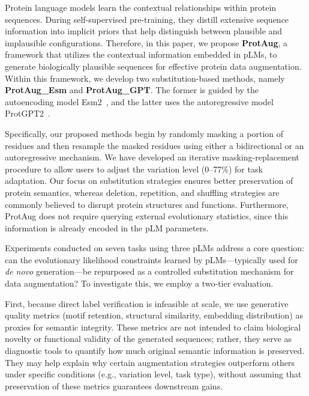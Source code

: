 \documentclass{article}
\begin{document}
Protein language models learn the contextual relationships within protein sequences. During self-supervised pre-training, they distill extensive sequence information into implicit priors that help distinguish between plausible and implausible configurations. Therefore, in this paper, we propose \textbf{ProtAug}, a framework that utilizes the contextual information embedded in pLMs, to generate biologically plausible sequences for effective protein data augmentation. Within this framework, we develop two substitution-based methods, namely \textbf{ProtAug\_Esm} and \textbf{ProtAug\_GPT}. The former is guided by the autoencoding model Esm2~\cite{lin2023esm2}, and the latter uses the autoregressive model ProtGPT2~\cite{ferruz2022protgpt2}. 

Specifically, our proposed methods begin by randomly masking a portion of residues and then resample the masked residues using either a bidirectional or an autoregressive mechanism. We have developed an iterative masking-replacement procedure to allow users to adjust the variation level (0–77\%) for task adaptation. Our focus on substitution strategies ensures better preservation of protein semantics, whereas deletion, repetition, and shuffling strategies are commonly believed to disrupt protein structures and functions. Furthermore, ProtAug does not require querying external evolutionary statistics, since this information is already encoded in the pLM parameters.

Experiments conducted on seven tasks using three pLMs address a core question: can the evolutionary likelihood constraints learned by pLMs—typically used for \textit{de novo} generation—be repurposed as a controlled substitution mechanism for data augmentation? To investigate this, we employ a two-tier evaluation.

First, because direct label verification is infeasible at scale, we use generative quality metrics (motif retention, structural similarity, embedding distribution) as proxies for semantic integrity.  These metrics are not intended to claim biological novelty or functional validity of the generated sequences; rather, they serve as diagnostic tools to quantify how much original semantic information is preserved. They may help explain why certain augmentation strategies outperform others under specific conditions (e.g., variation level, task type), without assuming that preservation of these metrics guarantees downstream gains.
\end{document}
